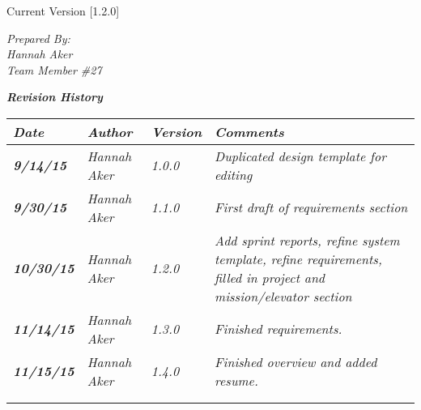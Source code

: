 


Current Version [1.2.0]
\vspace*{5mm}

{
\noindent
\textit{Prepared By:}\\
\textit{Hannah Aker}\\
\textit{Team Member \#27}
}

\vfill
\noindent
{ \textit{\textbf{Revision History}}}\\
\begin{tabular}{|>{\raggedright}p{1.5cm}|>{\raggedright}p{3cm}|>{\raggedright}p{1.5cm}|>{\raggedright}p{9cm}|}
\hline
\textit{\textbf{Date}} &  \textit{\textbf{Author}} & \textit{\textbf{Version}} & \textit{\textbf{Comments}}\tabularnewline
\hline
 \textit{\textbf{9/14/15}} & \textit{Hannah Aker} & \textit{1.0.0} & \textit{Duplicated design template for editing}\tabularnewline
\hline
 \textit{\textbf{9/30/15}} & \textit{Hannah Aker} & \textit{1.1.0} & \textit{First draft of requirements section}\tabularnewline
 \hline
  \textit{\textbf{10/30/15}} & \textit{Hannah Aker} & \textit{1.2.0} & \textit{Add sprint reports, refine system template, refine requirements, filled in project and mission/elevator section}\tabularnewline
\hline
 \textit{\textbf{11/14/15}} & \textit{Hannah Aker} & \textit{1.3.0} & \textit{Finished requirements.}\tabularnewline
\hline
 \textit{\textbf{11/15/15}} & \textit{Hannah Aker} & \textit{1.4.0} & \textit{Finished overview and added resume.}\tabularnewline
\hline
 &  &  & \tabularnewline
\hline
 &  &  & \tabularnewline
\hline
\end{tabular}
\vfill

